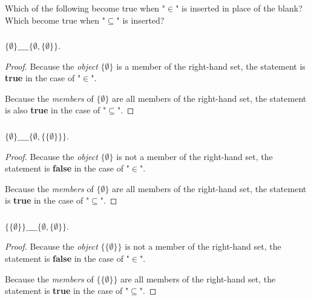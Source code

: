\documentclass{report}
\begin{document}
Which of the following become true when "$\in$" is inserted in place of the
  blank?
Which become true when "$\subseteq$" is inserted?

\subsubsection{}%
\label{ssub:baby-set-theory-1a}

$\{\emptyset\} \_\_\_\_ \{\emptyset, \{\emptyset\}\}$.

\begin{proof}

  Because the \textit{object} $\{\emptyset\}$ is a member of the right-hand set,
    the statement is \textbf{true} in the case of "$\in$".

  Because the \textit{members} of $\{\emptyset\}$ are all members of the
    right-hand set, the statement is also \textbf{true} in the case of
    "$\subseteq$".

\end{proof}

\subsubsection{}%
\label{ssub:baby-set-theory-1b}

$\{\emptyset\} \_\_\_\_ \{\emptyset, \{\{\emptyset\}\}\}$.

\begin{proof}

  Because the \textit{object} $\{\emptyset\}$ is not a member of the right-hand
    set, the statement is \textbf{false} in the case of "$\in$".

  Because the \textit{members} of $\{\emptyset\}$ are all members of the
    right-hand set, the statement is \textbf{true} in the case of "$\subseteq$".

\end{proof}

\subsubsection{}%
\label{ssub:baby-set-theory-1c}

$\{\{\emptyset\}\} \_\_\_\_ \{\emptyset, \{\emptyset\}\}$.

\begin{proof}

  Because the \textit{object} $\{\{\emptyset\}\}$ is not a member of the
    right-hand set, the statement is \textbf{false} in the case of "$\in$".

  Because the \textit{members} of $\{\{\emptyset\}\}$ are all members of the
    right-hand set, the statement is \textbf{true} in the case of "$\subseteq$".

\end{proof}
\end{document}
